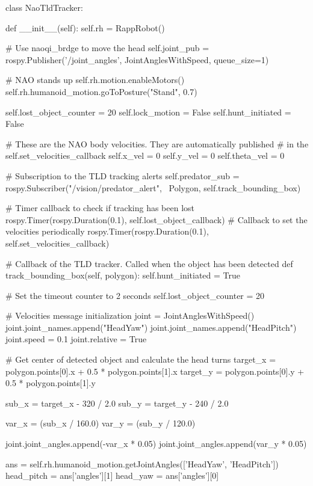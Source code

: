 class Nao\-Tld\-Tracker\-: \begin{DoxyVerb}def __init__(self):
    self.rh = RappRobot()

    # Use naoqi_brdge to move the head
    self.joint_pub = rospy.Publisher('/joint_angles', JointAnglesWithSpeed, queue_size=1)

    # NAO stands up
    self.rh.motion.enableMotors()
    self.rh.humanoid_motion.goToPosture("Stand", 0.7)

    self.lost_object_counter = 20
    self.lock_motion = False
    self.hunt_initiated = False

    # These are the NAO body velocities. They are automatically published
    # in the self.set_velocities_callback
    self.x_vel = 0
    self.y_vel = 0
    self.theta_vel = 0

    # Subscription to the TLD tracking alerts
    self.predator_sub = rospy.Subscriber("/vision/predator_alert", \
            Polygon, self.track_bounding_box)

    # Timer callback to check if tracking has been lost
    rospy.Timer(rospy.Duration(0.1), self.lost_object_callback)
    # Callback to set the velocities periodically
    rospy.Timer(rospy.Duration(0.1), self.set_velocities_callback)

# Callback of the TLD tracker. Called when the object has been detected
def track_bounding_box(self, polygon):
    self.hunt_initiated = True

    # Set the timeout counter to 2 seconds
    self.lost_object_counter = 20

    # Velocities message initialization
    joint = JointAnglesWithSpeed()
    joint.joint_names.append("HeadYaw")
    joint.joint_names.append("HeadPitch")
    joint.speed = 0.1
    joint.relative = True

    # Get center of detected object and calculate the head turns
    target_x = polygon.points[0].x + 0.5 * polygon.points[1].x
    target_y = polygon.points[0].y + 0.5 * polygon.points[1].y

    sub_x = target_x - 320 / 2.0
    sub_y = target_y - 240 / 2.0

    var_x = (sub_x / 160.0)
    var_y = (sub_y / 120.0)

    joint.joint_angles.append(-var_x * 0.05)
    joint.joint_angles.append(var_y * 0.05)

    ans = self.rh.humanoid_motion.getJointAngles(['HeadYaw', 'HeadPitch'])
    head_pitch = ans['angles'][1]
    head_yaw = ans['angles'][0]


\end{DoxyVerb}
